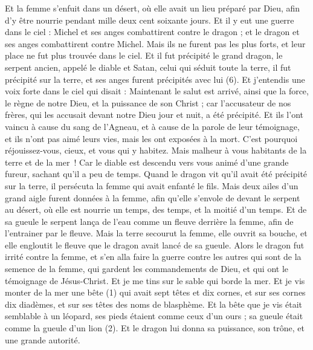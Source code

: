 \begin{multicols}{2}
Et la femme s'enfuit dans un désert, où elle avait un lieu préparé par Dieu, afin d’y être nourrie pendant mille deux cent soixante jours.
Et il y eut une guerre dans le ciel : Michel et ses anges combattirent contre le dragon ; et le dragon et ses anges combattirent contre Michel.
Mais ils ne furent pas les plus forts, et leur place ne fut plus trouvée dans le ciel.
Et il fut précipité le grand dragon, le serpent ancien, appelé le diable et Satan, celui qui séduit toute la terre, il fut précipité sur la terre, et ses anges furent précipités avec lui (6).
Et j’entendis une voix forte dans le ciel qui disait : Maintenant le salut est arrivé, ainsi que la force, le règne de notre Dieu, et la puissance de son Christ ; car l'accusateur de nos frères, qui les accusait devant notre Dieu jour et nuit, a été précipité.
Et ils l'ont vaincu à cause du sang de l'Agneau, et à cause de la parole de leur témoignage, et ils n'ont pas aimé leurs vies, mais les ont exposées à la mort.
C'est pourquoi réjouissez-vous, cieux, et vous qui y habitez. Mais malheur à vous habitants de la terre et de la mer ! Car le diable est descendu vers vous animé d’une grande fureur, sachant qu'il a peu de temps.
Quand le dragon vit qu'il avait été précipité sur la terre, il persécuta la femme qui avait enfanté le fils.
Mais deux ailes d'un grand aigle furent données à la femme, afin qu'elle s'envole de devant le serpent au désert, où elle est nourrie un temps, des temps, et la moitié d'un temps.
Et de sa gueule le serpent lança de l'eau comme un fleuve derrière la femme, afin de l’entrainer par le fleuve.
Mais la terre secourut la femme, elle ouvrit sa bouche, et elle engloutit le fleuve que le dragon avait lancé de sa gueule.
Alors le dragon fut irrité contre la femme, et s'en alla faire la guerre contre les autres qui sont de la semence de la femme, qui gardent les commandements de Dieu, et qui ont le témoignage de Jésus-Christ.
Et je me tins sur le sable qui borde la mer.
\VerseOne{}Et je vis monter de la mer une bête (1) qui avait sept têtes et dix cornes, et sur ses cornes dix diadèmes, et sur ses têtes des noms de blasphème.
Et la bête que je vis était semblable à un léopard, ses pieds étaient comme ceux d'un ours ; sa gueule était comme la gueule d'un lion (2). Et le dragon lui donna sa puissance, son trône, et une grande autorité.

\end{multicols}
